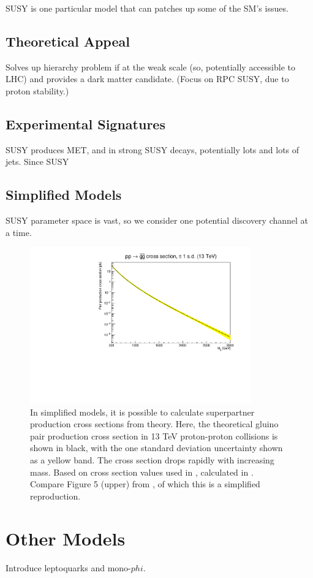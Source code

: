 SUSY is one particular model that can patches up some of the SM's issues.

  \subsection{Theoretical Appeal} \label{sec:SUSYappeal}

  Solves up hierarchy problem if at the weak scale (so, potentially accessible to LHC) and provides a dark matter candidate.
  (Focus on RPC SUSY, due to proton stability.)

  \subsection{Experimental Signatures} \label{sec:SUSYexp}

  SUSY produces MET, and in strong SUSY decays, potentially lots and lots of jets.
  Since SUSY

  \subsection{Simplified Models} \label{sec:SUSYsms}

  SUSY parameter space is vast, so we consider one potential discovery channel at a time.

  \begin{figure}[h!]
    \centering
    \includegraphics[width=0.85\textwidth]{figures/gluino_xsec.pdf}
    \caption[Theoretical gluino pair production cross section in simplified models.]{In simplified models, it is possible to calculate superpartner production cross sections from theory.
Here, the theoretical gluino pair production cross section in 13 TeV proton-proton collisions is shown in black, with the one standard deviation uncertainty shown as a yellow band.
The cross section drops rapidly with increasing mass.
Based on cross section values used in \cite{MT2_2019}, calculated in \cite{SUSYxsecs}.
Compare Figure 5 (upper) from \cite{SUSYxsecs}, of which this is a simplified reproduction.
}
    \label{fig:SUSYxsec}
  \end{figure}  

\section{Other Models} \label{sec:othermodels}

Introduce leptoquarks and mono-$phi$.

